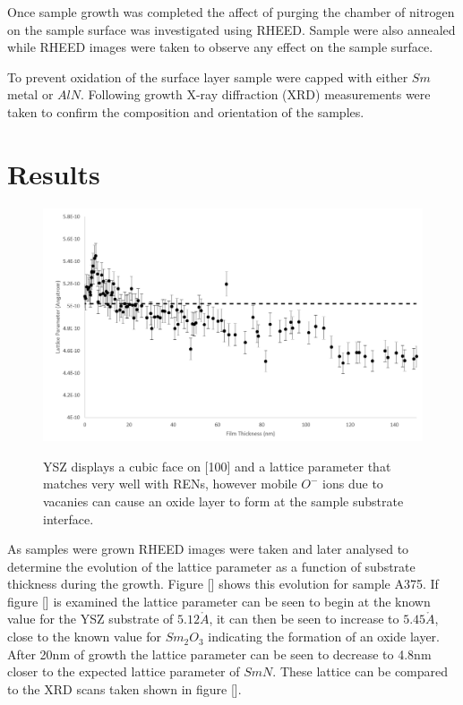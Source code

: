 \documentclass[11pt]{article}
\begin{document}
Once sample growth was completed the affect of purging the chamber of nitrogen on the sample surface was investigated using RHEED. Sample were also annealed while RHEED images were taken to observe any effect on the sample surface.

To prevent oxidation of the surface layer sample were capped with either $Sm$ metal or $AlN$. Following growth X-ray diffraction (XRD) measurements were taken to confirm the composition and orientation of the samples. 

\section{Results}

\begin{figure}[b!]
\centering
\includegraphics[width=\linewidth]{A375_1.PNG}
\label{fig:boat1}
\caption{YSZ displays a cubic face on [100] and a lattice parameter that matches very well with RENs, however mobile $O^-$ ions due to vacanies can cause an oxide layer to form at the sample substrate interface.}
\end{figure}

As samples were grown RHEED images were taken and later analysed to determine the evolution of the lattice parameter as a function of substrate thickness during the growth. Figure [] shows this evolution for sample A375. If figure [] is examined the lattice parameter can be seen to begin at the known value for the YSZ substrate of $5.12\mathring{A}$, it can then be seen to increase to $5.45\mathring{A}$, close to the known value for $Sm_2O_3$ indicating the formation of an oxide layer. After 20nm of growth the lattice parameter can be seen to decrease to 4.8nm closer to the expected lattice parameter of $SmN$. These lattice can be compared to the XRD scans taken shown in figure []. 
\end{document}
